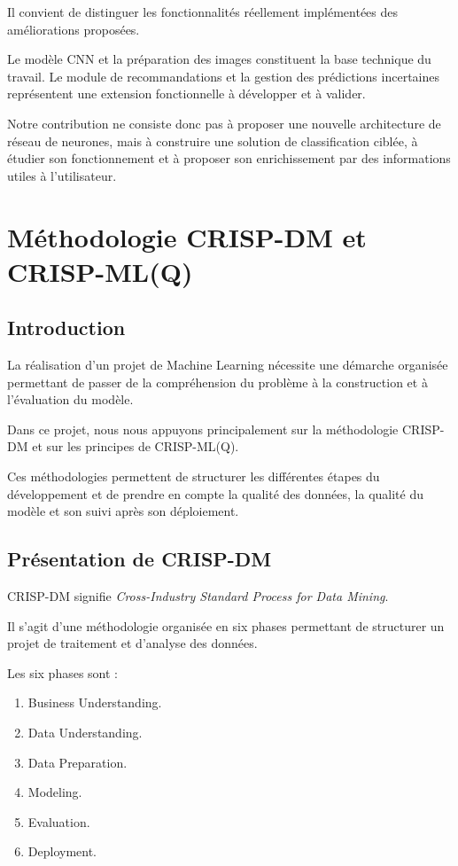 \documentclass[12pt,a4paper,oneside]{report}
\begin{document}
Il convient de distinguer les fonctionnalités réellement
implémentées des améliorations proposées.

Le modèle CNN et la préparation des images constituent
la base technique du travail. Le module de recommandations
et la gestion des prédictions incertaines représentent
une extension fonctionnelle à développer et à valider.

Notre contribution ne consiste donc pas à proposer
une nouvelle architecture de réseau de neurones, mais
à construire une solution de classification ciblée,
à étudier son fonctionnement et à proposer son
enrichissement par des informations utiles à l'utilisateur.


\chapter{Méthodologie CRISP-DM et CRISP-ML(Q)}

\section{Introduction}

La réalisation d'un projet de Machine Learning nécessite
une démarche organisée permettant de passer de la
compréhension du problème à la construction et à
l'évaluation du modèle.

Dans ce projet, nous nous appuyons principalement sur
la méthodologie CRISP-DM et sur les principes de
CRISP-ML(Q).

Ces méthodologies permettent de structurer les différentes
étapes du développement et de prendre en compte
la qualité des données, la qualité du modèle et son
suivi après son déploiement.

\section{Présentation de CRISP-DM}

CRISP-DM signifie \textit{Cross-Industry Standard Process
for Data Mining}.

Il s'agit d'une méthodologie organisée en six phases
permettant de structurer un projet de traitement
et d'analyse des données.

Les six phases sont :

\begin{enumerate}
    \item Business Understanding.
    \item Data Understanding.
    \item Data Preparation.
    \item Modeling.
    \item Evaluation.
    \item Deployment.
\end{enumerate}
\end{document}
